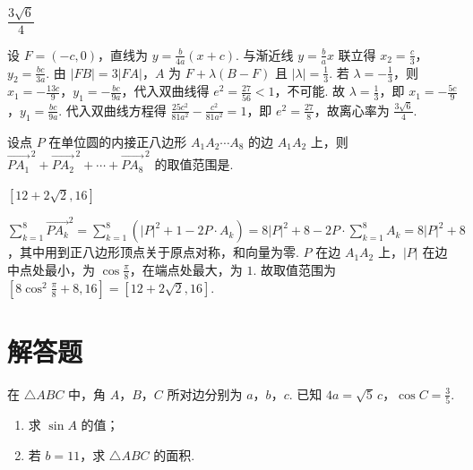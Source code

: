\begin{answer}
\(\dfrac{3\sqrt6}{4}\)
\end{answer}

\begin{solution}
设 \(F=(-c,0)\)，直线为 \(y=\frac{b}{4a}(x+c)\). 与渐近线 \(y=\frac{b}{a}x\) 联立得 \(x_2=\frac c3\)，\(y_2=\frac{bc}{3a}\). 由 \(|FB|=3|FA|\)，\(A\) 为 \(F+ \lambda(B-F)\) 且 \(|\lambda|=\frac13\). 若 \(\lambda=-\frac13\)，则 \(x_1=-\frac{13c}9\)，\(y_1=-\frac{bc}{9a}\)，代入双曲线得 \(e^2=\frac{27}{56}<1\)，不可能. 故 \(\lambda=\frac13\)，即 \(x_1=-\frac{5c}9\)，\(y_1=\frac{bc}{9a}\). 代入双曲线方程得 \(\frac{25c^2}{81a^2}-\frac{c^2}{81a^2}=1\)，即 \(e^2=\frac{27}8\)，故离心率为 \(\frac{3\sqrt6}4\).
\end{solution}

\begin{problem}
设点 \(P\) 在单位圆的内接正八边形 \(A_1A_2\cdots A_8\) 的边 \(A_1A_2\) 上，则 \(\overrightarrow{PA_1}^{\,2}+\overrightarrow{PA_2}^{\,2}+\cdots+\overrightarrow{PA_8}^{\,2}\) 的取值范围是\fillinblank{}.
\end{problem}

\begin{answer}
\([12+2\sqrt2,16]\)
\end{answer}

\begin{solution}
\(\sum_{k=1}^8\overrightarrow{PA_k}^2=\sum_{k=1}^8(|P|^2+1-2P\cdot A_k)=8|P|^2+8-2P\cdot\sum_{k=1}^8A_k=8|P|^2+8\)，其中用到正八边形顶点关于原点对称，和向量为零. \(P\) 在边 \(A_1A_2\) 上，\(|P|\) 在边中点处最小，为 \(\cos\frac\pi8\)，在端点处最大，为 \(1\). 故取值范围为 \([8\cos^2\frac\pi8+8,16]=[12+2\sqrt2,16]\).
\end{solution}

\section{解答题}

\begin{problem}
在 \(\triangle ABC\) 中，角 \(A\)，\(B\)，\(C\) 所对边分别为 \(a\)，\(b\)，\(c\). 已知 \(4a=\sqrt5\,c\)，\(\cos C=\frac35\).

\begin{enumerate}
\item 求 \(\sin A\) 的值；

\item 若 \(b=11\)，求 \(\triangle ABC\) 的面积.
\end{enumerate}
\end{problem}

